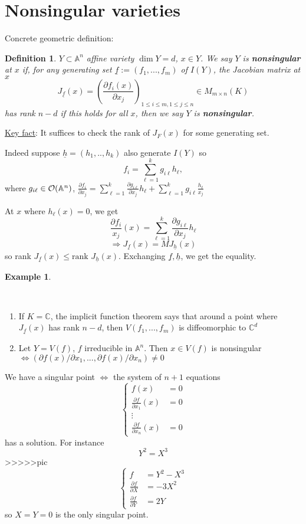 \documentclass[11pt]{article}
\newtheorem{dfn}[thm]{Definition}
\newtheorem{ex}[thm]{Example}
\newcommand{\affn}{\mathbb A}
\newcommand{\cplx}{\mathbb C}
\newcommand{\calo}{{\cal O}}
\newcommand{\pd}{\partial}
\newcommand{\Lrta}{\Longrightarrow}
\newcommand{\Llrta}{\Longleftrightarrow}
\begin{document}
\section*{Nonsingular varieties}
Concrete geometric definition:
\begin{dfn}
$Y\subset \affn^n$ affine variety $\dim Y=d$, $x\in Y$. We say $Y$ is \textbf{nonsingular} at $x$ if, for any generating set $\underline{f}:=(f_1,...,f_m)$ of $I(Y)$, the Jacobian matrix at $x$
$$
J_{\underline{f}}(x)=\left(\frac{\pd f_i(x)}{\pd x_j}\right)_{1\leq i\leq m, 1\leq j \leq n}\in M_{m\times n}(K)
$$
has rank $n-d$ if this holds for all $x$, then we say $Y$ is \textbf{nonsingular}.
\end{dfn}
\underline{Key fact}: It suffices to check the rank of $J_F(x)$ for some generating set. 

Indeed suppose $\underline{h}=(h_1,..,h_k)$ also generate $I(Y)$ so
$$
f_i = \sum^k_{\ell=1} g_{i\ell} h_\ell,
$$
where $g_{i\ell}\in \calo(\affn^n)$, $\frac{\pd f_i}{\pd x_j}=\sum^k_{\ell=1}\frac{\pd g_{i\ell}}{\pd x_j}h_\ell+\sum^k_{\ell=1}g_{i\ell}\frac{h_\ell}{x_j}$

At $x$ where $h_\ell(x)=0$, we get 
$$
\frac{\pd f_i}{x_j}(x)=\sum^k_{\ell=1}\frac{\pd g_{i\ell}}{\pd x_j}h_\ell
$$
$$
\Lrta J_{\underline{f}}(x)=M J_{\underline{h}}(x)
$$
so rank $J_{\underline{f}}(x)\leq \text{rank } J_{\underline{h}}(x)$. Exchanging $\underline{f},\underline{h}$, we get the equality.

\begin{ex}

\end{ex}\ 
\begin{enumerate}[label=(\arabic*)]
\item If $K=\cplx$, the implicit function theorem says that around a point where $J_{\underline{f}}(x)$ has rank $n-d$, then $V(f_1,...,f_m)$ is diffeomorphic to $\cplx^d$
\item Let $Y=V(f)$, $f$ irreducible in $\affn^n$. Then $x\in V(f)$ is nonsingular
$\Llrta(\pd f(x)/\pd x_1,...,\pd f(x)/\pd x_n)\neq 0$
\end{enumerate}


We have a singular point $\Llrta$ the system of $n+1$ equations 
$$
\left\{ \begin{aligned}
f(x)&=0\\
\frac{\pd f}{\pd x_1}(x)&=0\\
\vdots &\\
\frac{\pd f}{\pd x_n}(x)&=0
\end{aligned}\right.
$$
has a solution. 
For instance 
$$
Y^2=X^3
$$
>>>>>pic
$$
\left\{ \begin{aligned}
f&=Y^2-X^3\\
\frac{\pd f}{\pd X}&=-3X^2\\
\frac{\pd f}{\pd Y}&=2Y
\end{aligned}\right.
$$
so $X=Y=0$ is the only singular point.
\end{document}
